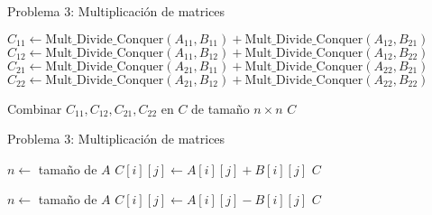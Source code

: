 \documentclass{beamer}
\begin{document}
\begin{frame}{Problema 3: Multiplicación de matrices}
\scriptsize
\begin{algorithm}[H]
\caption{Multiplicación de matrices por divide y vencerás(Parte II)}
\begin{algorithmic}[1]
    \State $C_{11} \gets \text{Mult\_Divide\_Conquer}(A_{11}, B_{11}) + \text{Mult\_Divide\_Conquer}(A_{12}, B_{21})$
    \State $C_{12} \gets \text{Mult\_Divide\_Conquer}(A_{11}, B_{12}) + \text{Mult\_Divide\_Conquer}(A_{12}, B_{22})$
    \State $C_{21} \gets \text{Mult\_Divide\_Conquer}(A_{21}, B_{11}) + \text{Mult\_Divide\_Conquer}(A_{22}, B_{21})$
    \State $C_{22} \gets \text{Mult\_Divide\_Conquer}(A_{21}, B_{12}) + \text{Mult\_Divide\_Conquer}(A_{22}, B_{22})$

    \State Combinar $C_{11}, C_{12}, C_{21}, C_{22}$ en $C$ de tamaño $n \times n$
    \State \Return $C$
  \EndFunction
\end{algorithmic}
\end{algorithm}
\end{frame}



\begin{frame}{Problema 3: Multiplicación de matrices}
\begin{algorithm}[H]
\caption{Multiplicación de matrices por divide y vencerás(Parte III)}
\begin{algorithmic}[1]
  \State $n \gets$ tamaño de $A$
      \State $C[i][j] \gets A[i][j] + B[i][j]$
    \EndFor
  \EndFor
  \State \Return $C$
\EndFunction

  \State $n \gets$ tamaño de $A$
      \State $C[i][j] \gets A[i][j] - B[i][j]$
    \EndFor
  \EndFor
  \State \Return $C$
\EndFunction
\end{algorithmic}
\end{algorithm}
\end{frame}
\end{document}
